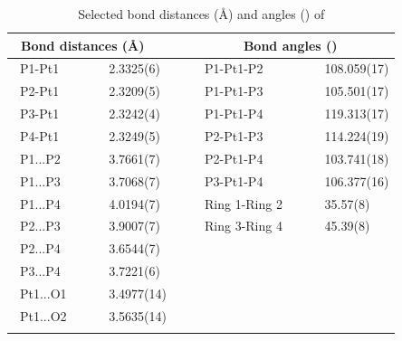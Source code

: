 \begin{table}[htp]
\caption[Selected bond distances (\AA) and angles (\degrees) of \ce{[Pt(Ph-thixantphos)2]}]{Selected bond distances (\AA) and angles (\degrees) of \ce{[Pt(Ph-thixantphos)2]}}
\vspace{1em}
\label{table:crystalbisthixantphosplatinum:lengths}
\small
\begin{center}
\begin{tabular}{l l l l}
	\toprule
	\multicolumn{2}{l}{\bfseries{~Bond distances (\si{\angstrom})}} & \multicolumn{2}{c}{\bfseries{Bond angles (\degrees)}} \\
	\midrule		
	~P1-Pt1		~~&~~2.3325(6)~~	&~~P1-Pt1-P2		~~	&~~108.059(17)	\\
	~P2-Pt1		~~&~~2.3209(5)~~	&~~P1-Pt1-P3		~~	&~~105.501(17)	\\
	~P3-Pt1		~~&~~2.3242(4)~~	&~~P1-Pt1-P4		~~	&~~119.313(17)	\\
	~P4-Pt1		~~&~~2.3249(5)~~	&~~P2-Pt1-P3		~~	&~~114.224(19)	\\
	~P1...P2		~~&~~3.7661(7)~~	&~~P2-Pt1-P4		~~	&~~103.741(18)	\\
	~P1...P3		~~&~~3.7068(7)~~	&~~P3-Pt1-P4		~~	&~~106.377(16)	\\
	~P1...P4		~~&~~4.0194(7)~~	&~~Ring 1-Ring 2	~~	&~~35.57(8)		\\
	~P2...P3		~~&~~3.9007(7)~~	&~~Ring 3-Ring 4	~~	&~~45.39(8)		\\
	~P2...P4		~~&~~3.6544(7)~~	&~~				~~	&~~				\\
	~P3...P4		~~&~~3.7221(6)~~	&~~				~~	&~~				\\
	~Pt1...O1		~~&~~3.4977(14)~~	&~~				~~	&~~				\\
	~Pt1...O2		~~&~~3.5635(14)~~	&~~				~~	&~~				\\
	\bottomrule{}
\end{tabular}
\end{center}
\end{table}

